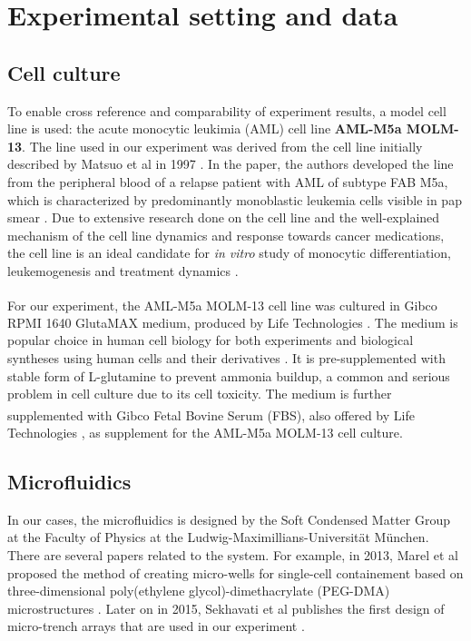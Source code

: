 \documentclass[pdftex,12pt,a4paper]{report}
\begin{document}
\section{Experimental setting and data}

\subsection{Cell culture}
\label{subsection:cell_culture}

To enable cross reference and comparability of experiment results, a model cell line is used: the acute monocytic leukimia (AML) cell line \textbf{AML-M5a MOLM-13}. The line used in our experiment was derived from the cell line initially described by Matsuo et al in 1997 \cite{matsuo1997two}. In the paper, the authors developed the line from the peripheral blood of a relapse patient with AML of subtype FAB M5a, which is characterized by predominantly monoblastic leukemia cells visible in pap smear \cite{arber20162016}. Due to extensive research done on the cell line and the well-explained mechanism of the cell line dynamics and response towards cancer medications, the cell line is an ideal candidate for \textit{in vitro} study of monocytic differentiation, leukemogenesis and treatment dynamics \cite{matsuo1997two, kelly2002ct53518, yokota1997internal}.

For our experiment, the AML-M5a MOLM-13 cell line was cultured in Gibco\textsuperscript{\textregistered} RPMI 1640 GlutaMAX medium, produced by Life Technologies \cite{gibcocellculture2017}. The medium is popular choice in human cell biology for both experiments and biological syntheses using human cells and their derivatives \cite{blight2000efficient, shimizu2002fabrication}. It is pre-supplemented with stable form of L-glutamine to prevent ammonia buildup, a common and serious problem in cell culture due to its cell toxicity\cite{satter1974effect}. The medium is further supplemented with Gibco\textsuperscript{\textregistered} Fetal Bovine Serum (FBS), also offered by Life Technologies \cite{gibcofbs2017}, as supplement for the AML-M5a MOLM-13 cell culture.


\subsection{Microfluidics}
\label{subsection:microfluid_env}

In our cases, the microfluidics is designed by the Soft Condensed Matter Group at the  Faculty of Physics at the Ludwig-Maximillians-Universit\"at M\"unchen. There are several papers related to the system. For example, in 2013, Marel et al proposed the method of creating micro-wells for single-cell containement based on three-dimensional poly(ethylene glycol)-dimethacrylate (PEG-DMA) microstructures \cite{marel2013arraying}. Later on in 2015, Sekhavati et al publishes the first design of micro-trench arrays that are used in our experiment \cite{sekhavati2015marker, sekhavati2015dynamic}.
\end{document}
